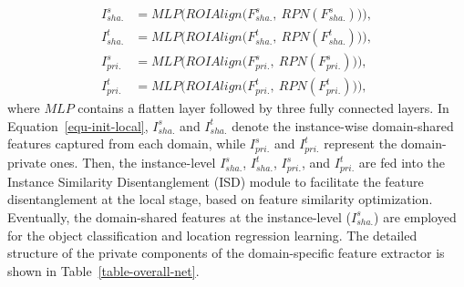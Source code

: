 \documentclass[journal]{IEEEtran}
\begin{document}
\begin{equation}
\begin{aligned}
I_{sha.}^{s} & = MLP\Big(ROIAlign\big(F_{sha.}^{s},~RPN(F_{sha.}^{s})\big)\Big), \\
I_{sha.}^{t}& = MLP\Big(ROIAlign\big(F_{sha.}^{t},~RPN(F_{sha.}^{t})\big)\Big),  \\
I_{pri.}^{s} &= MLP\Big(ROIAlign\big(F_{pri.}^{s},~RPN(F_{pri.}^{s})\big)\Big),  \\
I_{pri.}^{t} &= MLP\Big(ROIAlign\big(F_{pri.}^{t},~RPN(F_{pri.}^{t})\big)\Big),
\label{equ-init-local}
\end{aligned}
\end{equation}
where $MLP$ contains a flatten layer followed by three fully connected layers. In Equation~\ref{equ-init-local}, $I_{sha.}^{s}$ and $I_{sha.}^{t}$ denote the instance-wise domain-shared features captured from each domain, while $I_{pri.}^{s}$ and $I_{pri.}^{t}$ represent the domain-private ones. Then, the instance-level $I_{sha.}^{s}$, $I_{sha.}^{t}$, $I_{pri.}^{s}$, and $I_{pri.}^{t}$ are fed into the Instance Similarity Disentanglement (ISD) module to facilitate the feature disentanglement at the local stage, based on feature similarity optimization. Eventually, the domain-shared features at the instance-level ($I_{sha.}^{s}$) are employed for the object classification and location regression learning. The detailed structure of the private components of the domain-specific feature extractor is shown in Table~\ref{table-overall-net}.
\end{document}
